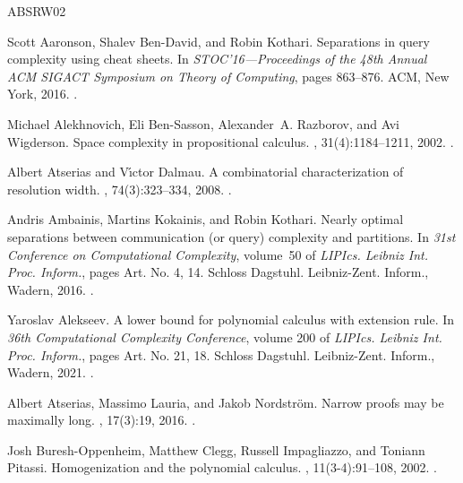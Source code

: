\documentclass[11pt]{article}
\numberwithin{equation}{section}
\begin{document}
\newcommand{\etalchar}[1]{$^{#1}$}
\begin{thebibliography}{ABSRW02}

Scott Aaronson, Shalev Ben-David, and Robin Kothari.
\newblock Separations in query complexity using cheat sheets.
\newblock In {\em S{TOC}'16---{P}roceedings of the 48th {A}nnual {ACM} {SIGACT}
  {S}ymposium on {T}heory of {C}omputing}, pages 863--876. ACM, New York, 2016.
\newblock \href {https://doi.org/10.1145/2897518.2897644}
  {}.

Michael Alekhnovich, Eli Ben-Sasson, Alexander~A. Razborov, and Avi Wigderson.
\newblock Space complexity in propositional calculus.
, 31(4):1184--1211, 2002.
\newblock \href {https://doi.org/10.1137/S0097539700366735}
  {}.

Albert Atserias and V\'{\i}ctor Dalmau.
\newblock A combinatorial characterization of resolution width.
, 74(3):323--334, 2008.
\newblock \href {https://doi.org/10.1016/j.jcss.2007.06.025}
  {}.

Andris Ambainis, Martins Kokainis, and Robin Kothari.
\newblock Nearly optimal separations between communication (or query)
  complexity and partitions.
\newblock In {\em 31st {C}onference on {C}omputational {C}omplexity}, volume~50
  of {\em LIPIcs. Leibniz Int. Proc. Inform.}, pages Art. No. 4, 14. Schloss
  Dagstuhl. Leibniz-Zent. Inform., Wadern, 2016.
\newblock \href {https://doi.org/10.4230/LIPIcs.CCC.2016.4}
  {}.

Yaroslav Alekseev.
\newblock A lower bound for polynomial calculus with extension rule.
\newblock In {\em 36th {C}omputational {C}omplexity {C}onference}, volume 200
  of {\em LIPIcs. Leibniz Int. Proc. Inform.}, pages Art. No. 21, 18. Schloss
  Dagstuhl. Leibniz-Zent. Inform., Wadern, 2021.
\newblock \href {https://doi.org/10.4230/LIPIcs.CCC.2021.21}
  {}.

Albert Atserias, Massimo Lauria, and Jakob Nordstr{\"{o}}m.
\newblock Narrow proofs may be maximally long.
, 17(3):19, 2016.
\newblock \href {https://doi.org/10.1145/2898435} {}.

Josh Buresh{-}Oppenheim, Matthew Clegg, Russell Impagliazzo, and Toniann
  Pitassi.
\newblock Homogenization and the polynomial calculus.
, 11(3-4):91--108, 2002.
\newblock \href {https://doi.org/10.1007/s00037-002-0171-6}
  {}.


\end{thebibliography}
\end{document}
